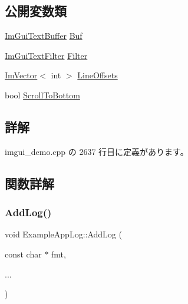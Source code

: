 \subsection*{公開変数類}
\begin{DoxyCompactItemize}
\item 
\mbox{\hyperlink{struct_im_gui_text_buffer}{Im\+Gui\+Text\+Buffer}} \mbox{\hyperlink{struct_example_app_log_a74fb7cd7bd8c2507b41331ebb7d0e56d}{Buf}}
\item 
\mbox{\hyperlink{struct_im_gui_text_filter}{Im\+Gui\+Text\+Filter}} \mbox{\hyperlink{struct_example_app_log_a4571947a6000e984ec8da9b7166e1e2b}{Filter}}
\item 
\mbox{\hyperlink{class_im_vector}{Im\+Vector}}$<$ int $>$ \mbox{\hyperlink{struct_example_app_log_af197fca7116f9033a5a5e831ee764ee2}{Line\+Offsets}}
\item 
bool \mbox{\hyperlink{struct_example_app_log_a6834b71563c0595e67b78afb6c7ce39d}{Scroll\+To\+Bottom}}
\end{DoxyCompactItemize}


\subsection{詳解}


 imgui\+\_\+demo.\+cpp の 2637 行目に定義があります。



\subsection{関数詳解}
\mbox{\label{struct_example_app_log_afd296fb3b2559acd341fd92883f8f571}} 
\subsubsection{\texorpdfstring{Add\+Log()}{AddLog()}}
{\footnotesize\ttfamily void Example\+App\+Log\+::\+Add\+Log (\begin{DoxyParamCaption}\item[{const char $\ast$}]{fmt,  }\item[{}]{... }\end{DoxyParamCaption})\hspace{0.3cm}{\ttfamily [inline]}}



